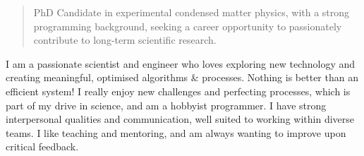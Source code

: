 \documentclass[10pt,a4paper,ragged2e,withhyper]{altacv}
\begin{document}
\begin{paracol}{2}
        
        
        
        \newpage
        
        \switchcolumn
        
        \vspace{-4em}
		{\textalignment
            \begin{quote}
            	PhD Candidate in experimental condensed matter physics, with a strong programming background, seeking a career opportunity to passionately contribute to long-term scientific research.
            \end{quote}
        \vspace{0.5em}
        I am a passionate scientist and engineer who loves exploring new technology and \newline creating meaningful, 
		optimised algorithms \& processes. Nothing is better than an \newline efficient system! I really enjoy new challenges and 
		perfecting processes, which is part of my drive in science, and am a hobbyist programmer. 
		I have strong interpersonal qualities and communication, well suited to working within diverse teams. 
		I like \newline teaching and mentoring, and am always wanting to improve upon critical feedback.
		}
        

\end{paracol}
\end{document}
